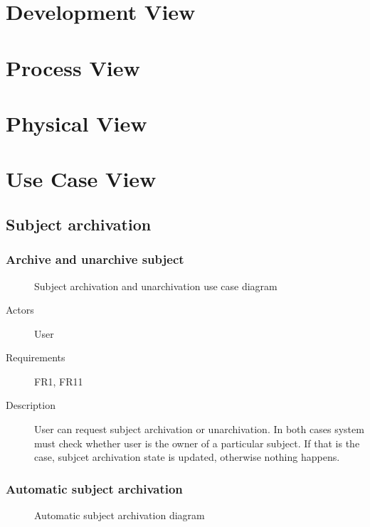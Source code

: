 \documentclass[
    english, %
]{VUMIFPSkursinis}
\begin{document}
\section{Development View}

\section{Process View}

\section{Physical View}

\section{Use Case View}

\subsection{Subject archivation}

\subsubsection{Archive and unarchive subject}

\begin{figure}[ht]
    \centering
    
    \label{archivation-use-case}
    \caption{Subject archivation and unarchivation use case diagram}
\end{figure}

\begin{description}
    \item[Actors] User
    \item[Requirements] FR1, FR11
    \item[Description] User can request subject archivation or unarchivation. In both cases system must check whether user is the owner of a particular subject. If that is the case, subjcet archivation state is updated, otherwise nothing happens.
\end{description}

\subsubsection{Automatic subject archivation}

\begin{figure}[ht]
    \centering
    
    \label{automatic-archivation-use-case}
    \caption{Automatic subject archivation diagram}
\end{figure}
\end{document}
